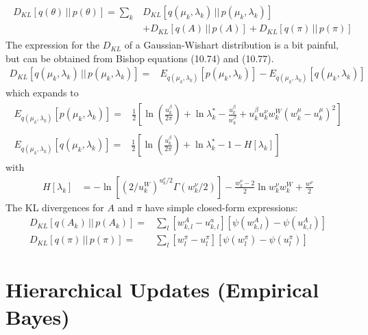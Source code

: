 \begin{align}
  \begin{split}
    D_{KL}[q(\theta ) \,||\, p(\theta )]
    =
    \sum_k & D_{KL}[q(\mu_k,\lambda_k) \,||\, p(\mu_k,\lambda_k)] \\
    & +
    D_{KL}[q(A) \,||\, p(A)]
    +
    D_{KL}[q(\pi) \,||\, p(\pi)]
  \end{split}
\end{align}
The expression for the $D_{KL}$ of a Gaussian-Wishart distribution is a bit painful, but can be obtained from Bishop equations (10.74) and (10.77).
\begin{align}
    D_{KL}[q(\mu_k,\lambda_k) \,||\, p(\mu_k,\lambda_k)]
    = & E_{q(\mu_k,\lambda_k)}[p(\mu_k,\lambda_k)]
        - E_{q(\mu_k,\lambda_k)}[q(\mu_k,\lambda_k)] 
\end{align}
which expands to
\begin{align}
  \begin{split}
    E_{q(\mu_k,\lambda_k)}[p(\mu_k,\lambda_k)]
    = &
    \frac{1}{2}
    \left[ 
      \ln \left( \frac{u^\beta_k}{2\pi} \right)
      +
      \ln \lambda^*_k
      - 
      \frac{u^\beta_k}{w^\beta_k} 
      +
      u^\beta_k u^\nu_k w^W_k (w^\mu_k - u^\mu_k)^2
    \right]
  \end{split}\\
  \begin{split}
    E_{q(\mu_k,\lambda_k)}[q(\mu_k,\lambda_k)]
    = &
    \frac{1}{2}
    \left[ 
      \ln \left( \frac{u^\beta_k}{2\pi} \right)
      +
      \ln \lambda^*_k
      - 
      1
      -
      H[\lambda_k]
    \right]
  \end{split}
\end{align}
with
\begin{align}
  H[\lambda_k]
  &= - \ln \left[(2/u^W_k)^{u^\nu_k / 2} \Gamma(w^\nu_k/2)\right] - \frac{w^\nu_k - 2}{2} \ln w^\nu_k w^W_k + \frac{w^\nu}{2}
\end{align}
The KL divergences for $A$ and $\pi$ have simple closed-form expressions:
\begin{align}
  D_{KL}[q(A_k) \,||\, p(A_k)]
  =& \sum_l [w^A_{k,l} - u^a_{k,l}] [\psi(w^A_{k,l}) - \psi(u^A_{k,l})]\\
  D_{KL}[q(\pi) \,||\, p(\pi)]
  =& \sum_l [w^\pi_l - u^\pi_l] [\psi(w^\pi_l) - \psi(u^\pi_l)]
\end{align}

\chapter{Hierarchical Updates (Empirical Bayes)}


